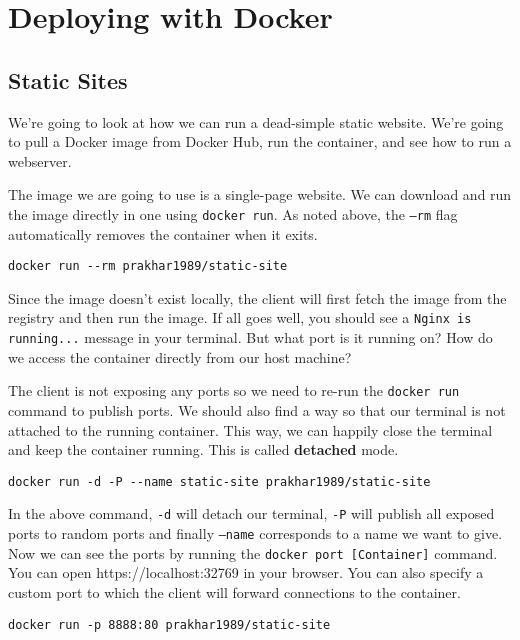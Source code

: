 \documentclass[twoside,twocolumn]{article}
\begin{document}
\section{Deploying with Docker}
\subsection{Static Sites}
We're going to look at how we can run a dead-simple static website. We're going to pull a Docker image from Docker Hub, run the container, and see how to run a webserver.

The image we are going to use is a single-page website. We can download and run the image directly in one using \texttt{docker run}.
As noted above, the \texttt{--rm} flag automatically removes the container when it exits.
\begin{verbatim}
docker run --rm prakhar1989/static-site
\end{verbatim}

Since the image doesn't exist locally, the client will first fetch the image from the registry and then run the image.
If all goes well, you should see a \texttt{Nginx is running...} message in your terminal. But what port is it running on? How do we access the container directly from our host machine?

The client is not exposing any ports so we need to re-run the \texttt{docker run} command to publish ports.
We should also find a way so that our terminal is not attached to the running container.
This way, we can happily close the terminal and keep the container running.
This is called \textbf{detached} mode.

\begin{verbatim}
docker run -d -P --name static-site prakhar1989/static-site
\end{verbatim}

In the above command, \texttt{-d} will detach our terminal, \texttt{-P} will publish all exposed ports to random ports and finally \texttt{--name} corresponds to a name we want to give.
Now we can see the ports by running the \texttt{docker port [Container]} command.
You can open https://localhost:32769 in your browser.
You can also specify a custom port to which the client will forward connections to the container.
\begin{verbatim}
docker run -p 8888:80 prakhar1989/static-site
\end{verbatim}
\end{document}
